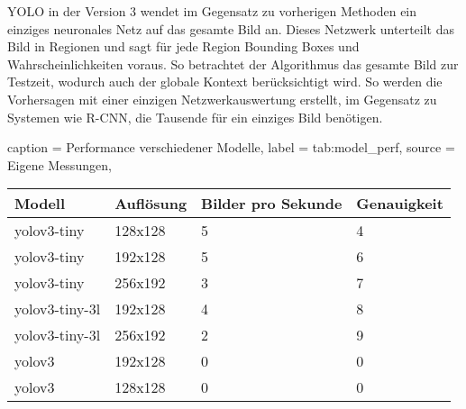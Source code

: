 \ac{YOLO} in der Version 3 wendet im Gegensatz zu vorherigen Methoden ein einziges neuronales Netz auf das gesamte Bild an. Dieses Netzwerk unterteilt das Bild in Regionen und sagt für jede Region Bounding Boxes und Wahrscheinlichkeiten voraus.
So betrachtet der Algorithmus das gesamte Bild zur Testzeit, wodurch auch der globale Kontext berücksichtigt wird. So werden die Vorhersagen mit einer einzigen Netzwerkauswertung erstellt, im Gegensatz zu Systemen wie \ac{R-CNN}, die Tausende für ein einziges Bild benötigen.

\begin{dhbwtable}{%
    caption	= Performance verschiedener Modelle,
    label	= tab:model_perf,
    source	= Eigene Messungen,
}
    \begin{tabular}{llll}
        \toprule
        \textbf{Modell}     & \textbf{Auflösung}    & \textbf{Bilder pro Sekunde}   & \textbf{Genauigkeit}\\\midrule
        yolov3-tiny         & 128x128               & 5                             & 4\\
        yolov3-tiny         & 192x128               & 5                             & 6\\
        yolov3-tiny         & 256x192               & 3                             & 7\\
        yolov3-tiny-3l      & 192x128               & 4                             & 8\\
        yolov3-tiny-3l      & 256x192               & 2                             & 9\\
        yolov3              & 192x128               & 0                             & 0\\
        yolov3              & 128x128               & 0                             & 0\\\bottomrule
    \end{tabular}    
\end{dhbwtable}





